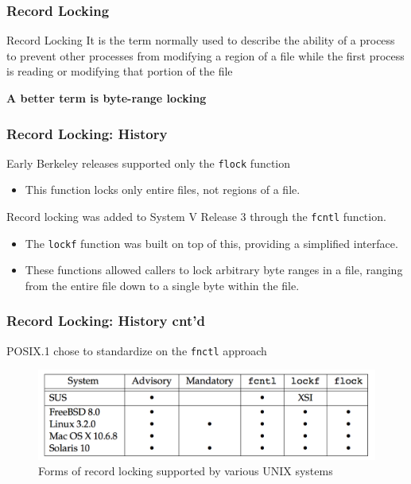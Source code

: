 \documentclass[newPxFont,sthlmFooter,nooffset]{beamer}
\begin{document}
\begin{frame}[t]
  \frametitle{Record Locking}

  \begin{block}{Record Locking}
   It is the term normally used to describe the ability of a process to prevent other processes from modifying a region of a file while the first process is reading or modifying that portion of the file
  \end{block}

\bigskip

\textbf{A better term is byte-range locking}
\end{frame}

\begin{frame}[t]
  \frametitle{Record Locking: History}
Early Berkeley releases supported only the \texttt{flock} function
\begin{itemize}
\item This function locks only entire files, not regions of a file.
\end{itemize}

Record locking was added to System V Release 3 through the \texttt{fcntl} function. 
\begin{itemize}
\item The \texttt{lockf} function was built on top of this, providing a
  simplified interface.
\item These functions allowed callers to lock arbitrary byte ranges in a file, ranging from the entire file down to a single byte within the file.
\end{itemize}

\end{frame}

\begin{frame}[t]
  \frametitle{Record Locking: History cnt'd}
POSIX.1 chose to standardize on the \texttt{fnctl} approach

  \begin{figure}[h]
   \centering
    \includegraphics[width=0.8\linewidth]{figures/fig14_2-reclock.png}
    \caption{Forms of record locking supported by various \textsc{UNIX} systems}
  \end{figure}
\end{frame}
\end{document}
